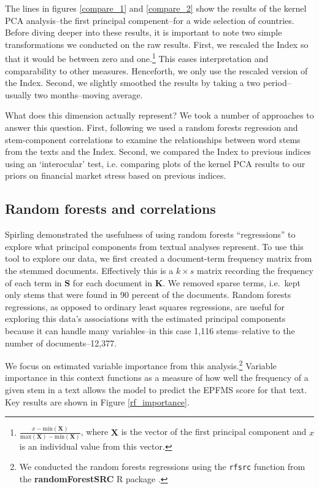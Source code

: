 \documentclass[]{article}
\begin{document}
The lines in figures \ref{compare_1} and \ref{compare_2} show the results of the kernel PCA analysis--the first principal compenent--for a wide selection of countries. Before diving deeper into these results, it is important to note two simple transformations we conducted on the raw results. First, we rescaled the Index so that it would be between zero and one.\footnote{\(\frac{x - \mathrm{min}(\bm{X})}{\mathrm{max}(\bm{X}) - \mathrm{min}(\bm{X})}\),
  where \(\bm{X}\) is the vector of the first principal component and
  \(x\) is an individual value from this vector.} This eases
interpretation and comparability to other measures. Henceforth, we only use the rescaled version of the Index. Second, we slightly smoothed the results by taking a two period--usually two months--moving average.

What does this dimension actually represent? We took a number of approaches to answer this question. First, following \cite{Spirling2012} we used a random forests regression \citep{Breiman2001,jones2015} and stem-component correlations to examine the relationships between word stems from the texts and the Index. Second, we compared the Index to previous indices using an `interocular' test, i.e. comparing plots of the kernel PCA results to our priors on financial market stress based on previous indices.

\subsection{Random forests and correlations}\label{random-forests}

Spirling \citeyearpar[88-90]{Spirling2012} demonstrated the usefulness of using random forests ``regressions'' to explore what principal components from textual analyses represent. To use this tool to explore our data, we first created a document-term
frequency matrix from the stemmed documents. Effectively this is a \(k \times s\) matrix recording the frequency of each term in \(\bm{S}\) for each document in \(\bm{K}\). We removed sparse terms, i.e.~kept only stems that were found in 90 percent of the documents. Random forests regressions, as opposed to ordinary least squares regressions, are useful for exploring this data's associations with the estimated principal components because it can handle many variables--in this case 1,116 stems--relative to the number of documents--12,377.

We focus on estimated variable importance from this analysis.\footnote{We conducted the random forests regressions using the \texttt{rfsrc} function from the \textbf{randomForestSRC} R package \citep{randomForestSRCCite}.} Variable importance in this context functions as a measure of how well the frequency of a given stem in a text allows the model to predict the EPFMS score for that text. Key results are shown in Figure \ref{rf_importance}.
\end{document}
